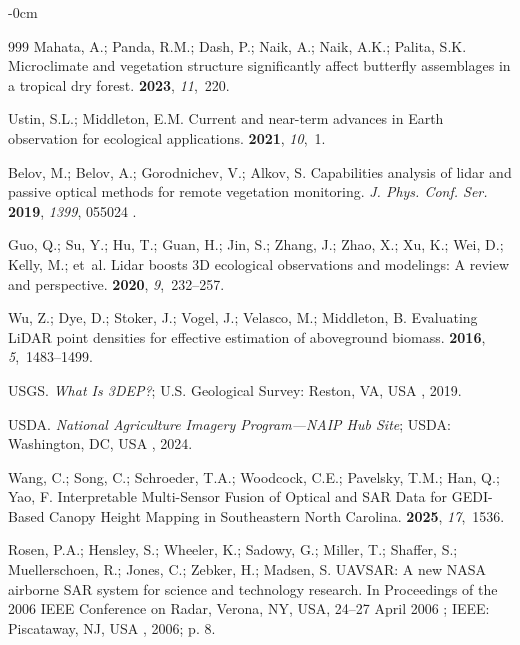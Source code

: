 \documentclass[remotesensing,article,accept,pdftex,moreauthors]{Definitions/mdpi}
\begin{document}
\begin{adjustwidth}{-\extralength}{0cm}
\begin{thebibliography}{999}
Mahata, A.; Panda, R.M.; Dash, P.; Naik, A.; Naik, A.K.; Palita, S.K.
\newblock Microclimate and vegetation structure significantly affect butterfly
  assemblages in a tropical dry forest.
 {\bf 2023}, {\em 11},~220.

Ustin, S.L.; Middleton, E.M.
\newblock Current and near-term advances in Earth observation for ecological
  applications.
 {\bf 2021}, {\em 10},~1.

Belov, M.; Belov, A.; Gorodnichev, V.; Alkov, S.
\newblock Capabilities analysis of lidar and passive optical methods for remote
  vegetation monitoring.
\newblock \emph{J. Phys. Conf. Ser.} \textbf{2019}, \emph{1399}, 055024
.

Guo, Q.; Su, Y.; Hu, T.; Guan, H.; Jin, S.; Zhang, J.; Zhao, X.; Xu, K.; Wei,
  D.; Kelly, M.;  et~al.
\newblock Lidar boosts 3D ecological observations and modelings: A review and
  perspective.
 {\bf 2020}, {\em
  9},~232--257.

Wu, Z.; Dye, D.; Stoker, J.; Vogel, J.; Velasco, M.; Middleton, B.
\newblock Evaluating LiDAR point densities for effective estimation of
  aboveground biomass.
 {\bf
  2016}, {\em 5},~1483--1499.

USGS.
\newblock \emph{What Is {3DEP}?}; U.S. Geological Survey: Reston, VA, USA
, 2019.

USDA.
\newblock \emph{National Agriculture Imagery Program---NAIP Hub Site}; USDA: Washington, DC, USA
, 2024.

Wang, C.; Song, C.; Schroeder, T.A.; Woodcock, C.E.; Pavelsky, T.M.; Han, Q.;
  Yao, F.
\newblock Interpretable Multi-Sensor Fusion of Optical and SAR Data for
  GEDI-Based Canopy Height Mapping in Southeastern North Carolina.
 {\bf 2025}, {\em 17},~1536.

Rosen, P.A.; Hensley, S.; Wheeler, K.; Sadowy, G.; Miller, T.; Shaffer, S.;
  Muellerschoen, R.; Jones, C.; Zebker, H.; Madsen, S.
\newblock UAVSAR: A new NASA airborne SAR system for science and technology
  research.
\newblock In Proceedings of the 2006 IEEE Conference on Radar, Verona, NY, USA, 24--27 April 2006
; IEEE: Piscataway, NJ, USA
, 2006; p. 8.


\end{thebibliography}
\end{adjustwidth}
\end{document}
